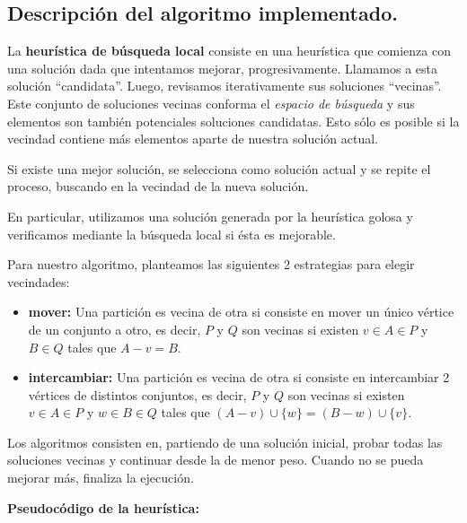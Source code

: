 \subsection{Descripción del algoritmo implementado.}
\vspace*{0.3cm}

La \textbf{heurística de búsqueda local} consiste en una heurística que
comienza con una solución dada que intentamos mejorar, progresivamente. Llamamos a esta solución ``candidata''. Luego, revisamos iterativamente sus soluciones ``vecinas''. Este conjunto de soluciones vecinas conforma el
\textit{espacio de búsqueda} y sus elementos son también potenciales soluciones candidatas. Esto sólo es posible si la vecindad contiene más elementos aparte de nuestra solución actual.

Si existe una mejor solución, se selecciona como solución actual y se repite el proceso, buscando en la vecindad de la nueva solución.

En particular, utilizamos una solución generada por la heurística golosa y verificamos mediante la búsqueda local si ésta es mejorable.

\vspace*{0.3cm}

Para nuestro algoritmo, planteamos las siguientes 2 estrategias para elegir vecindades:

\begin{itemize}
    \item \textbf{mover:} Una partición es vecina de otra si consiste en mover un único vértice de un conjunto a otro, es decir, $P$ y $Q$ son vecinas si existen $v \in A \in P$ y $B \in Q$ tales que $A - v = B$.

    \item \textbf{intercambiar:} Una partición es vecina de otra si consiste en intercambiar 2 vértices de distintos conjuntos, es decir, $P$ y $Q$ son vecinas si existen $v \in A \in P$ y $w \in B \in Q$ tales que $(A - v) \cup \{w\} = (B - w) \cup \{v\}$.
\end{itemize}

Los algoritmos consisten en, partiendo de una solución inicial, probar todas las soluciones vecinas y continuar desde la de menor peso. Cuando no se pueda mejorar más, finaliza la ejecución.

\vspace*{0.75cm}

\textbf{Pseudocódigo de la heurística:}

\vspace*{0.3cm}

